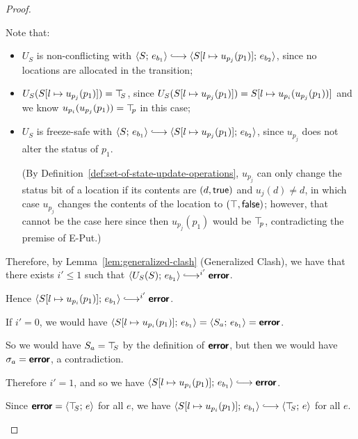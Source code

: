 \begin{proof}
\begin{enumerate}
\begin{enumerate}
\begin{itemize}
\begin{itemize}
          Note that:
          \begin{itemize}
          \item $U_S$ is non-conflicting with $\config{S}{e_{b_1}}
            \parstepsto
            \config{\extSRaw{S}{l}{u_{p_j}(p_1)}}{e_{b_2}}$, since
            no locations are allocated in the transition;
          \item $U_S(S[l \mapsto u_{p_j}(p_1)]) = \top\hspace{-0.85mm}_{S}$, since
            $U_S(S[l \mapsto u_{p_j}(p_1)]) =
            S[l \mapsto u_{p_i}(u_{p_j}(p_1))]$ and we know
            $u_{p_i}(u_{p_j}(p_1)) = \top\hspace{-0.85mm}_{p}$ in this case;
          \item $U_S$ is freeze-safe with $\config{S}{e_{b_1}}
            \parstepsto
            \config{\extSRaw{S}{l}{u_{p_j}(p_1)}}{e_{b_2}}$, since
            $u_{p_j}$ does not alter the status of $p_1$.

            (By Definition~\ref{def:set-of-state-update-operations},
            $u_{p_j}$ can only change the status bit of a location if
            its contents are $(d, \textsf{true})$ and $u_j(d) \neq
            d$, in which case $u_{p_j}$ changes the contents of the
            location to $(\top, \textsf{false})$; however, that
            cannot be the case here since then $u_{p_j}(p_1)$ would be
            $\top\hspace{-0.85mm}_{p}$, contradicting the premise of {\sc E-Put}.)
          \end{itemize}

          Therefore, by Lemma~\ref{lem:generalized-clash}
          (Generalized Clash), we have that there exists $i' \leq 1$
          such that $\config{U_S(S)}{e_{b_1}} \parstepsto^{i'}
          \error$.

          Hence $\config{\extSRaw{S}{l}{u_{p_i}(p_1)}}{e_{b_1}}
          \parstepsto^{i'} \error$.

          If $i' = 0$, we would have
          $\langle S[l \mapsto u_{p_i}(p_1)];\, e_{b_1} \rangle =
          \langle S_a;\, e_{b_1} \rangle = \textbf{\textsf{error}}$.

          So we would have $S_a = \top\hspace{-0.85mm}_{S}$ by the definition of
          $\textbf{\textsf{error}}$, but then we would have $\sigma_a = \textbf{\textsf{error}}$, a
          contradiction.

          Therefore $i' = 1$, and so we have
          $\config{\extSRaw{S}{l}{u_{p_i}(p_1)}}{e_{b_1}} \parstepsto
          \error$.

          Since $\textbf{\textsf{error}} = \langle \top\hspace{-0.85mm}_{S};\, e \rangle$ for all $e$, we have
          $\config{\extSRaw{S}{l}{u_{p_i}(p_1)}}{e_{b_1}}
          \parstepsto \config{\topS}{e}$ for all $e$.


\end{itemize}
\end{itemize}
\end{enumerate}
\end{enumerate}
\end{proof}
